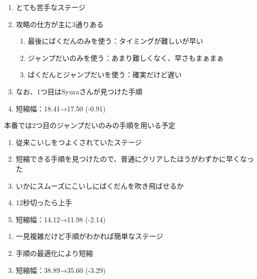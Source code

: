 \begin{enumerate}[label={\sarrow}]
\item とても苦手なステージ
\item 攻略の仕方が主に3通りある
  \begin{enumerate}[label={\sarrow}]
  \item 最後にばくだんのみを使う：タイミングが難しいが早い
  \item ジャンプだいのみを使う：あまり難しくなく、早さもまぁまぁ
  \item ばくだんとジャンプだいを使う：確実だけど遅い
  \end{enumerate}
\item なお、1つ目はSyuraさんが見つけた手順
\item 短縮幅：18.41→17.50 (-0.91)
\end{enumerate}
\begin{marker}
本番では2つ目のジャンプだいのみの手順を用いる予定
\end{marker}



\clearpage
\begin{enumerate}[label={\sarrow}]
\item 従来こいしをつよくされていたステージ
\item 短縮できる手順を見つけたので、普通にクリアしたほうがわずかに早くなった
\item いかにスムーズにこいしにばくだんを吹き飛ばせるか
\item 12秒切ったら上手
\item 短縮幅：14.12→11.98 (-2.14)
\end{enumerate}



\begin{enumerate}[label={\sarrow}]
\item 一見複雑だけど手順がわかれば簡単なステージ
\item 手順の最適化により短縮
\item 短縮幅：38.89→35.60 (-3.29)
\end{enumerate}



